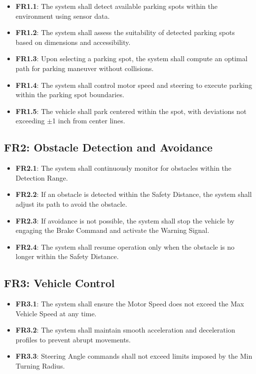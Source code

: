 \documentclass[12pt]{article}
\begin{document}
\begin{itemize}
    \item \textbf{FR1.1}: The system shall detect available parking spots within the environment using sensor data.
    \item \textbf{FR1.2}: The system shall assess the suitability of detected parking spots based on dimensions and accessibility.
    \item \textbf{FR1.3}: Upon selecting a parking spot, the system shall compute an optimal path for parking maneuver without collisions.
    \item \textbf{FR1.4}: The system shall control motor speed and steering to execute parking within the parking spot boundaries.
    \item \textbf{FR1.5}: The vehicle shall park centered within the spot, with deviations not exceeding $\pm$1 inch from center lines.
\end{itemize}

\subsection*{FR2: Obstacle Detection and Avoidance}

\begin{itemize}
    \item \textbf{FR2.1}: The system shall continuously monitor for obstacles within the Detection Range.
    \item \textbf{FR2.2}: If an obstacle is detected within the Safety Distance, the system shall adjust its path to avoid the obstacle.
    \item \textbf{FR2.3}: If avoidance is not possible, the system shall stop the vehicle by engaging the Brake Command and activate the Warning Signal.
    \item \textbf{FR2.4}: The system shall resume operation only when the obstacle is no longer within the Safety Distance.
\end{itemize}

\subsection*{FR3: Vehicle Control}

\begin{itemize}
    \item \textbf{FR3.1}: The system shall ensure the Motor Speed does not exceed the Max Vehicle Speed at any time.
    \item \textbf{FR3.2}: The system shall maintain smooth acceleration and deceleration profiles to prevent abrupt movements.
    \item \textbf{FR3.3}: Steering Angle commands shall not exceed limits imposed by the Min Turning Radius.
\end{itemize}
\end{document}
